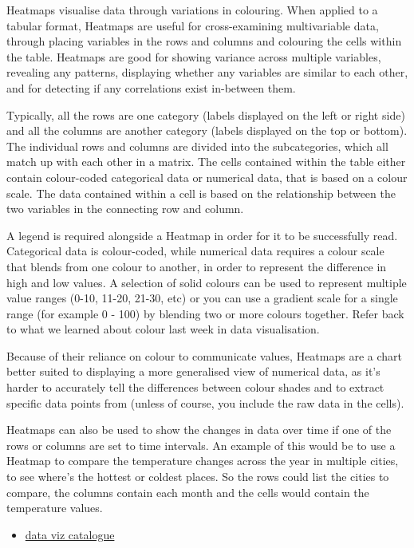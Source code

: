 \documentclass[
]{book}
\providecommand{\tightlist}{%
  \setlength{\itemsep}{0pt}\setlength{\parskip}{0pt}}
\begin{document}
Heatmaps visualise data through variations in colouring. When applied to a tabular format, Heatmaps are useful for cross-examining multivariable data, through placing variables in the rows and columns and colouring the cells within the table. Heatmaps are good for showing variance across multiple variables, revealing any patterns, displaying whether any variables are similar to each other, and for detecting if any correlations exist in-between them.

Typically, all the rows are one category (labels displayed on the left or right side) and all the columns are another category (labels displayed on the top or bottom). The individual rows and columns are divided into the subcategories, which all match up with each other in a matrix. The cells contained within the table either contain colour-coded categorical data or numerical data, that is based on a colour scale. The data contained within a cell is based on the relationship between the two variables in the connecting row and column.

A legend is required alongside a Heatmap in order for it to be successfully read. Categorical data is colour-coded, while numerical data requires a colour scale that blends from one colour to another, in order to represent the difference in high and low values. A selection of solid colours can be used to represent multiple value ranges (0-10, 11-20, 21-30, etc) or you can use a gradient scale for a single range (for example 0 - 100) by blending two or more colours together. Refer back to what we learned about colour last week in data visualisation.

Because of their reliance on colour to communicate values, Heatmaps are a chart better suited to displaying a more generalised view of numerical data, as it's harder to accurately tell the differences between colour shades and to extract specific data points from (unless of course, you include the raw data in the cells).

Heatmaps can also be used to show the changes in data over time if one of the rows or columns are set to time intervals. An example of this would be to use a Heatmap to compare the temperature changes across the year in multiple cities, to see where's the hottest or coldest places. So the rows could list the cities to compare, the columns contain each month and the cells would contain the temperature values.

\begin{itemize}
\tightlist
\item
  \href{https://datavizcatalogue.com/methods/heatmap.html}{data viz catalogue}
\end{itemize}
\end{document}
